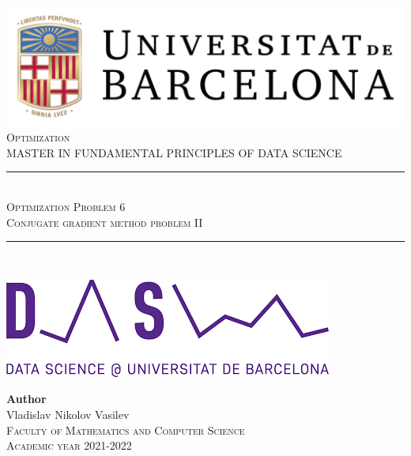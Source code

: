 \documentclass[11pt]{article}
\newcommand{\subject}{Optimization}
\newcommand{\autor}{Vladislav Nikolov Vasilev}
\newcommand{\titulo}{Optimization Problem 6}
\newcommand{\subtitulo}{Conjugate gradient method problem II}
\newcommand{\masters}{Master in Fundamental Principles of Data Science}
\begin{document}
    

\begin{titlepage}
  \begin{minipage}{\textwidth}
    \centering
    \includegraphics[scale=0.25]{img/ub-logo}\\[2cm]
    
    \textsc{\Large \subject\\[0.5cm]}
    \textsc{\uppercase\expandafter{\masters}}\\[1.5cm]
    
    \noindent\rule[-1ex]{\textwidth}{1pt}\\[1.5ex]
    \textsc{{\Huge \titulo\\[0.5ex]}}
    \textsc{{\Large \subtitulo\\}}
    \noindent\rule[-1ex]{\textwidth}{2pt}\\[3.5ex]
  \end{minipage}
  
  \vspace{2cm}
  
  \begin{minipage}{\textwidth}
    \centering
    
    \includegraphics[scale=0.4]{img/ub-ds-logo}
    \vspace{2cm}
    
    \textbf{Author}\\ {\autor{}}\\[2.5ex]
    \textsc{Faculty of Mathematics and Computer Science}\\
    \vspace{1em}
    \textsc{Academic year 2021-2022}
  \end{minipage}
\end{titlepage}
\end{document}
